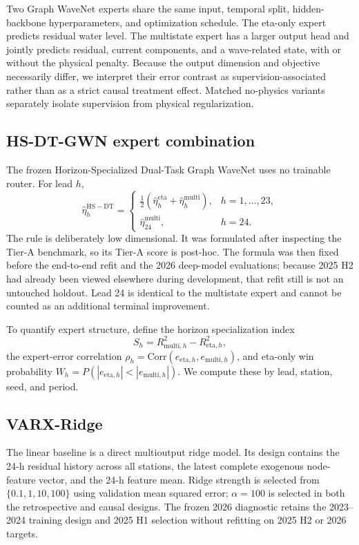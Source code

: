 \documentclass[final,5p,times,twocolumn]{elsarticle}
\begin{document}
Two Graph WaveNet experts share the same input, temporal split, hidden-backbone hyperparameters, and optimization schedule. The eta-only expert predicts residual water level. The multistate expert has a larger output head and jointly predicts residual, current components, and a wave-related state, with or without the physical penalty. Because the output dimension and objective necessarily differ, we interpret their error contrast as supervision-associated rather than as a strict causal treatment effect. Matched no-physics variants separately isolate supervision from physical regularization.

\subsection{HS-DT-GWN expert combination}
The frozen Horizon-Specialized Dual-Task Graph WaveNet uses no trainable router. For lead $h$,
\begin{equation}
\hat\eta^{\mathrm{HS-DT}}_{h}=
\begin{cases}
\tfrac12(\hat\eta^{\mathrm{eta}}_{h}+\hat\eta^{\mathrm{multi}}_{h}), & h=1,\ldots,23,\\
\hat\eta^{\mathrm{multi}}_{24}, & h=24.
\end{cases}
\label{eq:hsdt}
\end{equation}
The rule is deliberately low dimensional. It was formulated after inspecting the Tier-A benchmark, so its Tier-A score is post-hoc. The formula was then fixed before the end-to-end refit and the 2026 deep-model evaluations; because 2025 H2 had already been viewed elsewhere during development, that refit still is not an untouched holdout. Lead 24 is identical to the multistate expert and cannot be counted as an additional terminal improvement.

To quantify expert structure, define the horizon specialization index
\begin{equation}
S_h=R^2_{\mathrm{multi},h}-R^2_{\mathrm{eta},h},
\end{equation}
the expert-error correlation $\rho_h=\mathrm{Corr}(e_{\mathrm{eta},h},e_{\mathrm{multi},h})$, and eta-only win probability $W_h=P(|e_{\mathrm{eta},h}|<|e_{\mathrm{multi},h}|)$. We compute these by lead, station, seed, and period.

\subsection{VARX-Ridge}
The linear baseline is a direct multioutput ridge model. Its design contains the 24-h residual history across all stations, the latest complete exogenous node-feature vector, and the 24-h feature mean. Ridge strength is selected from $\{0.1,1,10,100\}$ using validation mean squared error; $\alpha=100$ is selected in both the retrospective and causal designs. The frozen 2026 diagnostic retains the 2023--2024 training design and 2025 H1 selection without refitting on 2025 H2 or 2026 targets.
\end{document}
